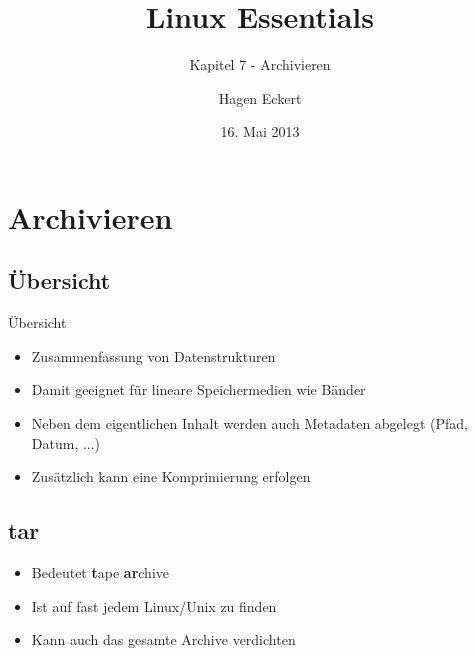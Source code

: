 \documentclass[aspectratio=43]{beamer}
\title[Linux Essentials  - Kapitel 7 - Archivieren]{Linux Essentials}
\subtitle{Kapitel 7 - Archivieren}
\author{Hagen Eckert}
\date{16. Mai 2013}
\begin{document}
\logoframe

\frame{\titlepage}

\setcounter{tocdepth}{1}
\section[Gliederung]{}
\frame{\tableofcontents}

\section{Archivieren}
\subsection{Übersicht}
\begin{frame} 
	\begin{block}{Übersicht} 
	\begin{itemize}
	\item Zusammenfassung von Datenstrukturen
	\item Damit geeignet für lineare Speichermedien wie Bänder 
	\item Neben dem eigentlichen Inhalt werden auch Metadaten abgelegt  (Pfad, Datum, ...)
	\item Zusätzlich kann eine Komprimierung erfolgen
	\end{itemize}
	\end{block}


\end{frame}


\subsection{tar}
\begin{frame} 
	\begin{block}{} 
	\begin{itemize}
	\item Bedeutet \textbf{t}ape \textbf{ar}chive
	\item Ist auf fast jedem Linux/Unix zu finden
	\item Kann auch das gesamte Archive verdichten
	\end{itemize}
	\end{block}
\end{frame}
\end{document}
